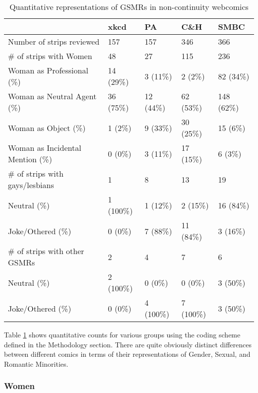 \documentclass[man,12pt]{apa6}
\begin{document}
\begin{table}[!htbp]
\caption{Quantitative representations of GSMRs in non-continuity webcomics}
\label{quantitative}
    \begin{tabular}{l|llll}
    ~                               & xkcd     & PA       & C\&H      & SMBC      \\ \hline
    Number of strips reviewed       & 157      & 157      & 346      & 366       \\ \hline
    \# of strips with Women          & 48       & 27       & 115      & 236       \\
    Woman as Professional (\%)       & 14 (29\%) & 3 (11\%)  & 2 (2\%)   & 82 (34\%)  \\
     Woman as Neutral Agent (\%)     & 36 (75\%) & 12 (44\%) & 62 (53\%) & 148 (62\%) \\
    Woman as Object (\%)             & 1 (2\%)   & 9 (33\%)  & 30 (25\%) & 15  (6\%)  \\
    Woman as Incidental Mention (\%) & 0 (0\%)   & 3 (11\%)  & 17 (15\%) & 6 (3\%)    \\ \hline
    \# of strips with gays/lesbians  & 1        & 8        & 13       & 19        \\
    Neutral (\%)                     & 1 (100\%) & 1 (12\%)  & 2 (15\%)  & 16 (84\%)  \\
    Joke/Othered (\%)                & 0 (0\%)   & 7 (88\%)  & 11 (84\%) & 3 (16\%)   \\ \hline
    \# of strips with other GSMRs    & 2        & 4        & 7        & 6         \\
    Neutral (\%)                     & 2 (100\%) & 0 (0\%)   & 0 (0\%)   & 3 (50\%)   \\
    Joke/Othered (\%)                & 0 (0\%)   & 4 (100\%) & 7 (100\%) & 3 (50\%)   \\
    \end{tabular}
\end{table}

Table \ref{quantitative} shows quantitative counts for various groups using the coding scheme defined in the Methodology section. There are quite obviously distinct differences between different comics in terms of their representations of Gender, Sexual, and Romantic Minorities.

\subsubsection{Women}
\end{document}

